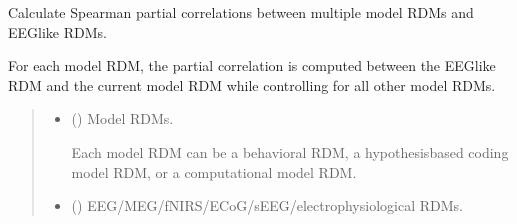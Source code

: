 \documentclass[letterpaper,10pt,english]{sphinxhowto}
\begin{document}

\begin{fulllineitems}
\label{\detokenize{corr_cal_by_rdm:neurora.corr_cal_by_rdm.rdms_partialcorr}}
\pysigstartsignatures
{}
\pysigstopsignatures
\sphinxAtStartPar
Calculate Spearman partial correlations between multiple model RDMs and EEG\sphinxhyphen{}like RDMs.

\sphinxAtStartPar
For each model RDM, the partial correlation is computed between the
EEG\sphinxhyphen{}like RDM and the current model RDM while controlling for all other
model RDMs.
\begin{quote}\begin{description}
\begin{itemize}
\item {} 
\sphinxAtStartPar
{} (\sphinxstyleliteralemphasis{\sphinxupquote{, }}\sphinxstyleliteralemphasis{\sphinxupquote{ {[}}}\sphinxstyleliteralemphasis{\sphinxupquote{, }}\sphinxstyleliteralemphasis{\sphinxupquote{, }}\sphinxstyleliteralemphasis{\sphinxupquote{{]}}}) \textendash{} 
\sphinxAtStartPar
Model RDMs.

\sphinxAtStartPar
Each model RDM can be a behavioral RDM, a hypothesis\sphinxhyphen{}based coding
model RDM, or a computational model RDM.


\item {} 
\sphinxAtStartPar
{} () \textendash{} 
\sphinxAtStartPar
EEG/MEG/fNIRS/ECoG/sEEG/electrophysiological RDMs.


\end{itemize}
\end{description}
\end{quote}
\end{fulllineitems}
\end{document}
